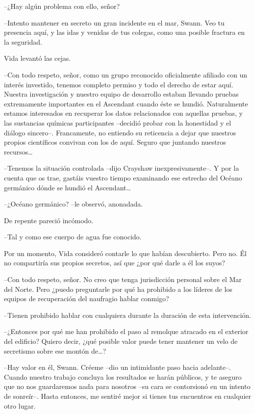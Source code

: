 {--¿Hay algún problema con ello, señor?}

{--Intento mantener en secreto un gran incidente en el mar, Swann. Veo
 tu presencia aquí, y las idas y venidas de tus colegas, como una posible
fractura en la seguridad.}

{Vida levantó las cejas.}

{--Con todo respeto, señor, como un grupo reconocido oficialmente
 afiliado con un interés investido, tenemos completo permiso y todo el
 derecho de estar aquí. Nuestra investigación y nuestro equipo de
 desarrollo estaban llevando pruebas extremamente importantes en el
 Ascendant cuando éste se hundió. Naturalmente estamos interesados en
 recuperar los datos relacionados con aquellas pruebas, y las sustancias
 químicas participantes --decidió probar con la honestidad y el diálogo
 sincero--. Francamente, no entiendo su reticencia a dejar que nuestros
 propios científicos convivan con los de aquí. Seguro que juntando
 nuestros recursos\ldots{}}

{--Tenemos la situación controlada --dijo Crayshaw inexpresivamente--. Y
 por la cuenta que os trae, gastáis vuestro tiempo examinando ese
 estrecho del Océano germánico dónde se hundió el Ascendant\ldots{}}

{--¿Océano germánico? --le observó, anonadada.}

{De repente pareció incómodo.}

{--Tal y como ese cuerpo de agua fue conocido.}

{Por un momento, Vida consideró contarle lo que habían descubierto. Pero
 no. Él no compartiría sus propios secretos, así que ¿por qué darle a él
los suyos?}

{--Con todo respeto, señor. No creo que tenga jurisdicción personal
 sobre el Mar del Norte. Pero ¿puedo preguntarle por qué ha prohibido a
 los líderes de los equipos de recuperación del naufragio hablar
conmigo?}

{--Tienen prohibido hablar con cualquiera durante la duración de esta
intervención.}

{--¿Entonces por qué me han prohibido el paso al remolque atracado en el
 exterior del edificio? Quiero decir, ¿qué posible valor puede tener
 mantener un velo de secretismo sobre ese montón de\ldots{}?}

{--Hay valor en él, Swann. Créeme --dio un intimidante paso hacia
 adelante--. Cuando nuestro trabajo concluya los resultados se harán
 públicos, y te aseguro que no nos guardaremos nada para nosotros --su
 cara se contorsionó en un intento de sonreír--. Hasta entonces, me
sentiré mejor si tienes tus encuentros en cualquier otro lugar.}

